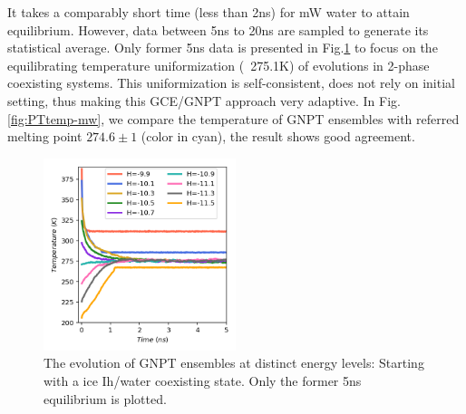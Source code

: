 \documentclass[aps,prl,twocolumn,superscriptaddress]{revtex4-1}
\begin{document}
It takes a comparably short time (less than 2ns) for mW water to attain equilibrium. However, data between 5ns to 20ns are  sampled to generate its statistical average. Only former 5ns data is presented in Fig.\ref{fig:evolution} to focus on the equilibrating temperature uniformization (~275.1K) of evolutions in 2-phase coexisting systems. This uniformization is self-consistent, does not rely on initial setting, thus making this GCE/GNPT approach very adaptive. In Fig. \ref{fig:PTtemp-mw}, we compare the temperature of GNPT ensembles with referred melting point $274.6\pm 1$  \cite{Molinero2009} (color in cyan), the result shows good agreement. 
\begin{figure}[ht]
\centering{}\includegraphics[width=0.5\textwidth]{PoteScan.png} 
\caption{The evolution of GNPT ensembles at distinct energy levels: Starting with a ice Ih/water coexisting state. Only the former 5ns equilibrium is plotted.
\label{fig:evolution} }
\end{figure}
\end{document}
